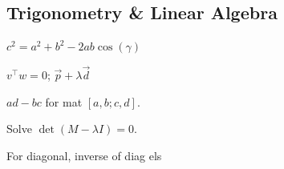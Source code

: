 \subsection{Trigonometry \& Linear Algebra}
 $c^2 = a^2 + b^2 - 2ab \cos(\gamma)$

 $v^\top w = 0$;
 $\vec{p} + \lambda \vec{d}$

\shortdefinition[Determinant] $ad - bc$ for mat $[a, b; c, d]$.

\shortdefinition[Eigenvalues] Solve $\det(M - \lambda I) = 0$.

 For diagonal, inverse of diag els
